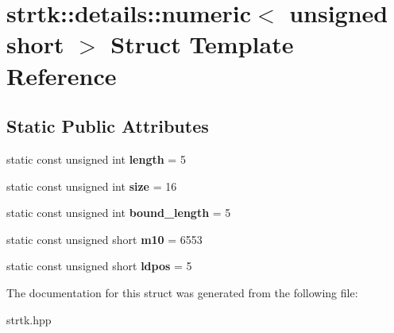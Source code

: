 \hypertarget{structstrtk_1_1details_1_1numeric_3_01unsigned_01short_01_4}{\section{strtk\-:\-:details\-:\-:numeric$<$ unsigned short $>$ Struct Template Reference}
\label{structstrtk_1_1details_1_1numeric_3_01unsigned_01short_01_4}
}
\subsection*{Static Public Attributes}
\begin{DoxyCompactItemize}
\item 
\hypertarget{structstrtk_1_1details_1_1numeric_3_01unsigned_01short_01_4_a67e205f8e088602f8d7b3d0c59ce27d1}{static const unsigned int {\bfseries length} = 5}\label{structstrtk_1_1details_1_1numeric_3_01unsigned_01short_01_4_a67e205f8e088602f8d7b3d0c59ce27d1}

\item 
\hypertarget{structstrtk_1_1details_1_1numeric_3_01unsigned_01short_01_4_ac451fa05f0af686d35acbf4b9964c056}{static const unsigned int {\bfseries size} = 16}\label{structstrtk_1_1details_1_1numeric_3_01unsigned_01short_01_4_ac451fa05f0af686d35acbf4b9964c056}

\item 
\hypertarget{structstrtk_1_1details_1_1numeric_3_01unsigned_01short_01_4_a6902a1802d00ad4c876320284b9b9ba0}{static const unsigned int {\bfseries bound\-\_\-length} = 5}\label{structstrtk_1_1details_1_1numeric_3_01unsigned_01short_01_4_a6902a1802d00ad4c876320284b9b9ba0}

\item 
\hypertarget{structstrtk_1_1details_1_1numeric_3_01unsigned_01short_01_4_ab6057b2ffb2c4c94b98032dac01fcbdb}{static const unsigned short {\bfseries m10} = 6553}\label{structstrtk_1_1details_1_1numeric_3_01unsigned_01short_01_4_ab6057b2ffb2c4c94b98032dac01fcbdb}

\item 
\hypertarget{structstrtk_1_1details_1_1numeric_3_01unsigned_01short_01_4_aa50167d83082f508fadcb04571d9ba7b}{static const unsigned short {\bfseries ldpos} = 5}\label{structstrtk_1_1details_1_1numeric_3_01unsigned_01short_01_4_aa50167d83082f508fadcb04571d9ba7b}

\end{DoxyCompactItemize}


The documentation for this struct was generated from the following file\-:\begin{DoxyCompactItemize}
\item 
strtk.\-hpp\end{DoxyCompactItemize}
